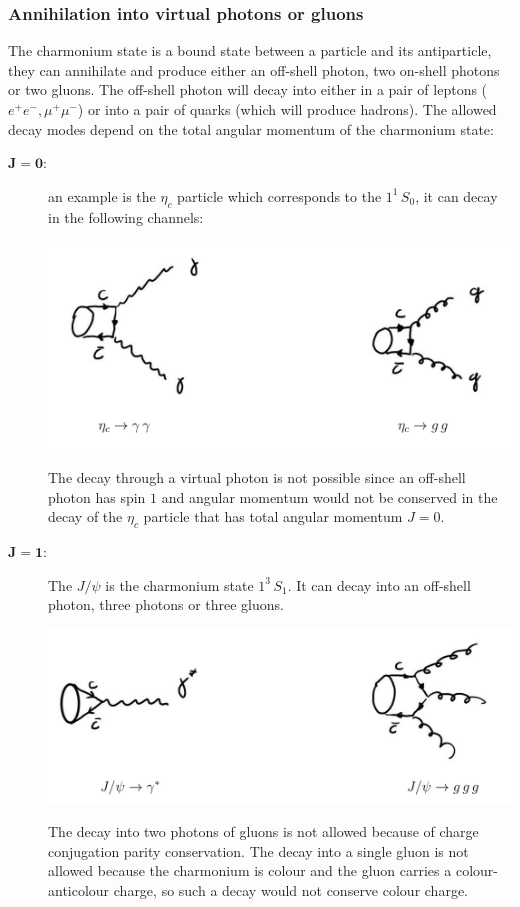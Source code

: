 \documentclass[12pt]{article}
\begin{document}
\subsubsection{Annihilation into virtual photons or gluons}
The charmonium state is a bound state between a particle and its antiparticle, they can annihilate and produce either an off-shell photon, two on-shell photons or two gluons. The off-shell photon will decay into either in a pair of leptons ($e^+e^-,\mu^+\mu^-$) or into a pair of quarks (which will produce hadrons). The allowed decay modes depend on the total angular momentum of the charmonium state:
\begin{description}
\item[$\mathbf{J=0}$:] an example is the $\eta_c$ particle which corresponds to the $1^{1}\,S_0$, it can decay in the following channels:
\begin{center}
\includegraphics[scale=0.2]{images/etacgammagammagg.png}
\end{center}
The decay through a virtual photon is not possible since an off-shell photon has spin $1$ and angular momentum would not be conserved in the decay of the $\eta_c$ particle that has total angular momentum $J=0$.
\item[$\mathbf{J=1}$:] The $J/\psi$ is the charmonium state $1^{3}\,S_1$. It can decay into an off-shell photon, three photons or three gluons. 

\begin{center}
\includegraphics[scale=0.2]{images/jpsigammastarggg.png}
\end{center}
The decay into two photons of gluons is not allowed because of charge conjugation parity conservation. The decay into a single gluon is not allowed because the charmonium is colour and the gluon carries a colour-anticolour charge, so such a decay would not conserve colour charge.   
\end{description}  
\end{document}
